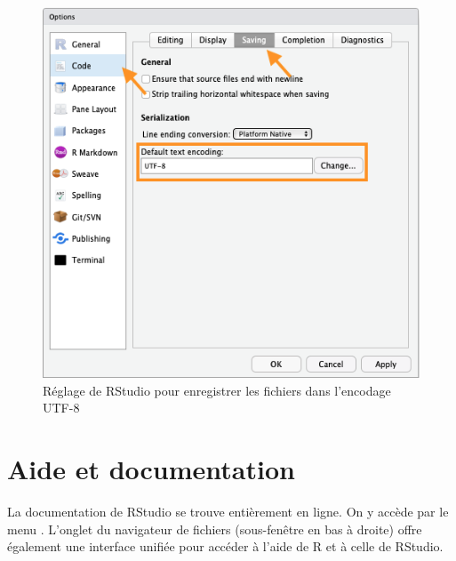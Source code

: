 \begin{figure}
  \centering
  \includegraphics{images/rstudio-utf-8}
  \caption{Réglage de RStudio pour enregistrer les fichiers dans
    l'encodage UTF-8}
  \label{fig:rstudio:rstudio-utf-8}
\end{figure}


\section{Aide et documentation}
\label{sec:rstudio:aide}

La documentation de RStudio se trouve entièrement en ligne. On y
accède par le menu . L'onglet  du navigateur de
fichiers (sous-fenêtre en bas à droite) offre également une interface
unifiée pour accéder à l'aide de R et à celle de RStudio.


